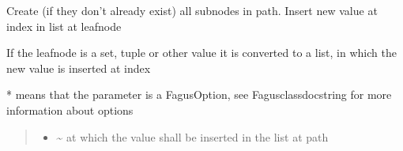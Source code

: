 \documentclass[a4paper,10pt,english]{sphinxmanual}
\begin{document}
\begin{fulllineitems}
\begin{fulllineitems}
\label{\detokenize{fagus.fagus:fagus.fagus.Fagus.insert}}
\pysigstartsignatures
{}
\pysigstopsignatures
\sphinxAtStartPar
Create (if they don’t already exist) all sub\sphinxhyphen{}nodes in path. Insert new value at index in list at leaf\sphinxhyphen{}node

\sphinxAtStartPar
If the leaf\sphinxhyphen{}node is a set, tuple or other value it is converted to a list, in which the new value is inserted at
index

\sphinxAtStartPar
* means that the parameter is a FagusOption, see Fagus\sphinxhyphen{}class\sphinxhyphen{}docstring for more information about options
\begin{quote}\begin{description}
\begin{itemize}
\item {}
\sphinxAtStartPar
{} \textendash{} \textasciitilde{} at which the value shall be inserted in the list at path


\end{itemize}
\end{description}
\end{quote}
\end{fulllineitems}
\end{fulllineitems}
\end{document}

